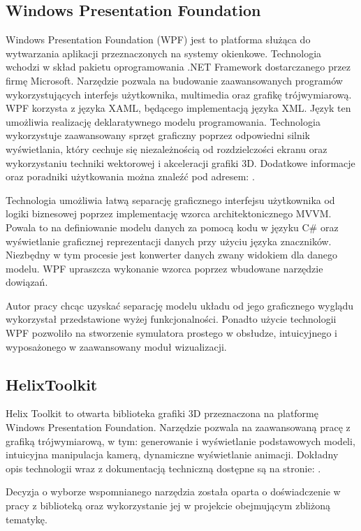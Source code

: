\documentclass[12pt, oneside]{report}
\theoremstyle{definition}
\begin{document}
\subsection{Windows Presentation Foundation}

Windows Presentation Foundation (WPF) jest to platforma służąca do wytwarzania aplikacji przeznaczonych na systemy okienkowe. Technologia wchodzi w skład pakietu oprogramowania .NET Framework dostarczanego przez firmę Microsoft. Narzędzie pozwala na budowanie zaawansowanych programów wykorzystujących interfejs użytkownika, multimedia oraz grafikę trójwymiarową. WPF korzysta z języka XAML, będącego implementacją języka XML. Język ten umożliwia realizację deklaratywnego modelu programowania. Technologia wykorzystuje zaawansowany sprzęt graficzny poprzez odpowiedni silnik wyświetlania, który cechuje się niezależnością od rozdzielczości ekranu oraz wykorzystaniu techniki wektorowej i akceleracji grafiki 3D. Dodatkowe informacje oraz poradniki użytkowania można znaleźć pod adresem: \cite{WPF}.

Technologia umożliwia łatwą separację graficznego interfejsu użytkownika od logiki biznesowej poprzez implementację wzorca architektonicznego MVVM. Powala to na definiowanie modelu danych za pomocą kodu w języku C\# oraz wyświetlanie graficznej reprezentacji danych przy użyciu języka znaczników. Niezbędny w tym procesie jest konwerter danych zwany widokiem dla danego modelu. WPF upraszcza wykonanie wzorca poprzez wbudowane narzędzie dowiązań.

Autor pracy chcąc uzyskać separację modelu układu od jego graficznego wyglądu wykorzystał przedstawione wyżej funkcjonalności. Ponadto użycie technologii WPF pozwoliło na stworzenie symulatora prostego w obsłudze, intuicyjnego i wyposażonego w zaawansowany moduł wizualizacji.

\subsection{HelixToolkit}
Helix Toolkit to otwarta biblioteka grafiki 3D przeznaczona na platformę Windows Presentation Foundation. Narzędzie pozwala na zaawansowaną pracę z grafiką trójwymiarową, w tym: generowanie i wyświetlanie podstawowych modeli, intuicyjna manipulacja kamerą, dynamiczne wyświetlanie animacji. Dokładny opis technologii wraz z dokumentacją techniczną dostępne są na stronie: \cite{HelixToolkit}.

Decyzja o wyborze wspomnianego narzędzia została oparta o doświadczenie w pracy z biblioteką oraz wykorzystanie jej w projekcie obejmującym zbliżoną tematykę.
\end{document}
